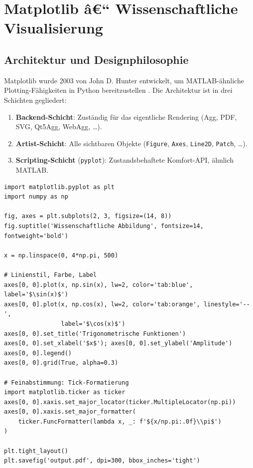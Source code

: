 \documentclass[12pt, a4paper]{article}
\begin{document}
\section{Matplotlib â€“ Wissenschaftliche Visualisierung}
\label{sec:matplotlib}

\subsection{Architektur und Designphilosophie}
\label{subsec:mpl-arch}

Matplotlib wurde 2003 von John D. Hunter entwickelt, um MATLAB-ähnliche
Plotting-Fähigkeiten in Python bereitzustellen \cite{hunter2007matplotlib}.
Die Architektur ist in drei Schichten gegliedert:

\begin{enumerate}
  \item \textbf{Backend-Schicht}: Zuständig für das eigentliche Rendering
        (Agg, PDF, SVG, Qt5Agg, WebAgg, \ldots).
  \item \textbf{Artist-Schicht}: Alle sichtbaren Objekte (\texttt{Figure},
        \texttt{Axes}, \texttt{Line2D}, \texttt{Patch}, \ldots).
  \item \textbf{Scripting-Schicht} (\texttt{pyplot}): Zustandsbehaftete
        Komfort-API, ähnlich MATLAB.
\end{enumerate}

\begin{lstlisting}[caption={Objektbasierte Matplotlib-API (empfohlen)}]
import matplotlib.pyplot as plt
import numpy as np

fig, axes = plt.subplots(2, 3, figsize=(14, 8))
fig.suptitle('Wissenschaftliche Abbildung', fontsize=14, fontweight='bold')

x = np.linspace(0, 4*np.pi, 500)

# Linienstil, Farbe, Label
axes[0, 0].plot(x, np.sin(x), lw=2, color='tab:blue', label='$\sin(x)$')
axes[0, 0].plot(x, np.cos(x), lw=2, color='tab:orange', linestyle='--',
                label='$\cos(x)$')
axes[0, 0].set_title('Trigonometrische Funktionen')
axes[0, 0].set_xlabel('$x$'); axes[0, 0].set_ylabel('Amplitude')
axes[0, 0].legend()
axes[0, 0].grid(True, alpha=0.3)

# Feinabstimmung: Tick-Formatierung
import matplotlib.ticker as ticker
axes[0, 0].xaxis.set_major_locator(ticker.MultipleLocator(np.pi))
axes[0, 0].xaxis.set_major_formatter(
    ticker.FuncFormatter(lambda x, _: f'${x/np.pi:.0f}\\pi$')
)

plt.tight_layout()
plt.savefig('output.pdf', dpi=300, bbox_inches='tight')
\end{lstlisting}
\end{document}
